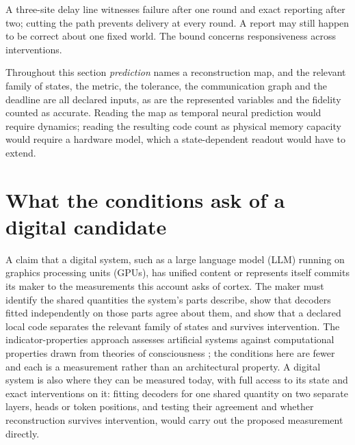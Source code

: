 \documentclass[12pt]{article}
\renewcommand{\cite}[1]{\citep{#1}}
\begin{document}
A three-site delay line witnesses failure after one round and exact reporting after two; cutting the path prevents delivery at every round. A report may still happen to be correct about one fixed world. The bound concerns responsiveness across interventions.

Throughout this section \emph{prediction} names a reconstruction map, and the relevant family of states, the metric, the tolerance, the communication graph and the deadline are all declared inputs, as are the represented variables and the fidelity counted as accurate. Reading the map as temporal neural prediction would require dynamics; reading the resulting code count as physical memory capacity would require a hardware model, which a state-dependent readout would have to extend.

\section{What the conditions ask of a digital candidate}
\label{sec:gpu}

A claim that a digital system, such as a large language model (LLM) running on graphics processing units (GPUs), has unified content or represents itself commits its maker to the measurements this account asks of cortex. The maker must identify the shared quantities the system's parts describe, show that decoders fitted independently on those parts agree about them, and show that a declared local code separates the relevant family of states and survives intervention. The indicator-properties approach assesses artificial systems against computational properties drawn from theories of consciousness \cite{butlin2023}; the conditions here are fewer and each is a measurement rather than an architectural property. A digital system is also where they can be measured today, with full access to its state and exact interventions on it: fitting decoders for one shared quantity on two separate layers, heads or token positions, and testing their agreement and whether reconstruction survives intervention, would carry out the proposed measurement directly.
\end{document}
